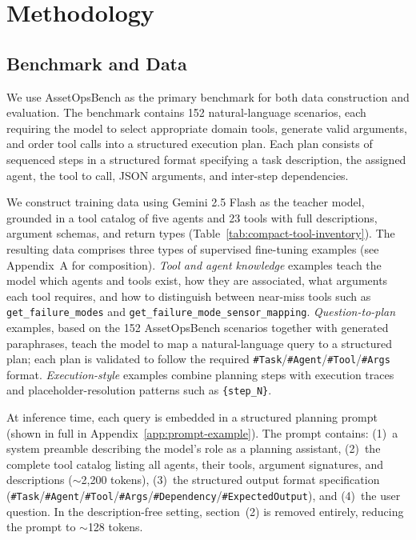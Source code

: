 \documentclass[conference]{IEEEtran}
\begin{document}
\section{Methodology}

\subsection{Benchmark and Data}

We use AssetOpsBench \cite{b2} as the primary benchmark for both data construction and evaluation. The benchmark contains 152 natural-language scenarios, each requiring the model to select appropriate domain tools, generate valid arguments, and order tool calls into a structured execution plan. Each plan consists of sequenced steps in a structured format specifying a task description, the assigned agent, the tool to call, JSON arguments, and inter-step dependencies.

We construct training data using Gemini 2.5 Flash \cite{b5} as the teacher model, grounded in a tool catalog of five agents and 23 tools with full descriptions, argument schemas, and return types (Table~\ref{tab:compact-tool-inventory}). The resulting data comprises three types of supervised fine-tuning examples (see Appendix~A for composition). \emph{Tool and agent knowledge} examples teach the model which agents and tools exist, how they are associated, what arguments each tool requires, and how to distinguish between near-miss tools such as \texttt{get\_failure\_modes} and \texttt{get\_failure\_mode\_sensor\_mapping}. \emph{Question-to-plan} examples, based on the 152 AssetOpsBench scenarios together with generated paraphrases, teach the model to map a natural-language query to a structured plan; each plan is validated to follow the required \texttt{\#Task}/\texttt{\#Agent}/\texttt{\#Tool}/\texttt{\#Args} format. \emph{Execution-style} examples combine planning steps with execution traces and placeholder-resolution patterns such as \texttt{\{step\_N\}}.

At inference time, each query is embedded in a structured planning prompt (shown in full in Appendix~\ref{app:prompt-example}). The prompt contains: (1)~a system preamble describing the model's role as a planning assistant, (2)~the complete tool catalog listing all agents, their tools, argument signatures, and descriptions ($\sim$2,200 tokens), (3)~the structured output format specification (\texttt{\#Task}/\texttt{\#Agent}/\texttt{\#Tool}/\texttt{\#Args}/\texttt{\#Dependency}/\texttt{\#ExpectedOutput}), and (4)~the user question. In the description-free setting, section~(2) is removed entirely, reducing the prompt to $\sim$128 tokens.
\end{document}
